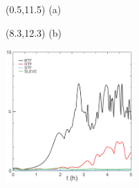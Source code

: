 \documentclass{article}
\begin{document}
\TPMargin{2pt}
\begin{textblock}{0.5}(0.5,11.5)
\normalsize
(a)
\end{textblock}
\begin{textblock}{1}(8.3,12.3)
\normalsize
(b)
\end{textblock}
\begin{minipage}{1.8in}
	\vspace*{-0.13in}
	\includegraphics[height=2in]{img/klemp-w.png}
\end{minipage}
\hspace{1em}
\begin{minipage}{2.5in}
	\footnotesize
	
\end{minipage}
\end{document}
